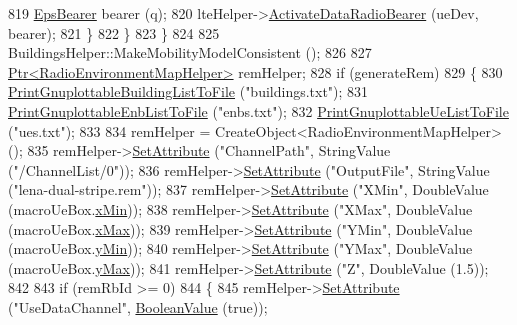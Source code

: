\begin{DoxyCode}
819               \hyperlink{structns3_1_1EpsBearer}{EpsBearer} bearer (q);
820               lteHelper->\hyperlink{classns3_1_1LteHelper_ac896e16cf162e4beeaa292d39ab1b700}{ActivateDataRadioBearer} (ueDev, bearer);
821             \}
822         \}
823     \}
824 
825   BuildingsHelper::MakeMobilityModelConsistent ();
826 
827   \hyperlink{classns3_1_1Ptr}{Ptr<RadioEnvironmentMapHelper>} remHelper;
828   \textcolor{keywordflow}{if} (generateRem)
829     \{
830       \hyperlink{lena-dual-stripe_8cc_aa3ac76c624e240e8ea6e415ff2289b4b}{PrintGnuplottableBuildingListToFile} (\textcolor{stringliteral}{"buildings.txt"});
831       \hyperlink{lena-dual-stripe_8cc_a7e3aa5272ba032faa7717e0f3ba2f73d}{PrintGnuplottableEnbListToFile} (\textcolor{stringliteral}{"enbs.txt"});
832       \hyperlink{lena-dual-stripe_8cc_ad818a3dd4c090b8ecaba926e5272c409}{PrintGnuplottableUeListToFile} (\textcolor{stringliteral}{"ues.txt"});
833 
834       remHelper = CreateObject<RadioEnvironmentMapHelper> ();
835       remHelper->\hyperlink{classns3_1_1ObjectBase_ac60245d3ea4123bbc9b1d391f1f6592f}{SetAttribute} (\textcolor{stringliteral}{"ChannelPath"}, StringValue (\textcolor{stringliteral}{"/ChannelList/0"}));
836       remHelper->\hyperlink{classns3_1_1ObjectBase_ac60245d3ea4123bbc9b1d391f1f6592f}{SetAttribute} (\textcolor{stringliteral}{"OutputFile"}, StringValue (\textcolor{stringliteral}{"lena-dual-stripe.rem"}));
837       remHelper->\hyperlink{classns3_1_1ObjectBase_ac60245d3ea4123bbc9b1d391f1f6592f}{SetAttribute} (\textcolor{stringliteral}{"XMin"}, DoubleValue (macroUeBox.\hyperlink{classns3_1_1Box_a1fd6a43d53258323331d34da600ff1c5}{xMin}));
838       remHelper->\hyperlink{classns3_1_1ObjectBase_ac60245d3ea4123bbc9b1d391f1f6592f}{SetAttribute} (\textcolor{stringliteral}{"XMax"}, DoubleValue (macroUeBox.\hyperlink{classns3_1_1Box_a50021049c756e770329145b25d9533a2}{xMax}));
839       remHelper->\hyperlink{classns3_1_1ObjectBase_ac60245d3ea4123bbc9b1d391f1f6592f}{SetAttribute} (\textcolor{stringliteral}{"YMin"}, DoubleValue (macroUeBox.\hyperlink{classns3_1_1Box_a3865ed092f941186823539c9979002f8}{yMin}));
840       remHelper->\hyperlink{classns3_1_1ObjectBase_ac60245d3ea4123bbc9b1d391f1f6592f}{SetAttribute} (\textcolor{stringliteral}{"YMax"}, DoubleValue (macroUeBox.\hyperlink{classns3_1_1Box_a001fd430a14b19efe925c818a332e392}{yMax}));
841       remHelper->\hyperlink{classns3_1_1ObjectBase_ac60245d3ea4123bbc9b1d391f1f6592f}{SetAttribute} (\textcolor{stringliteral}{"Z"}, DoubleValue (1.5));
842 
843       \textcolor{keywordflow}{if} (remRbId >= 0)
844         \{
845           remHelper->\hyperlink{classns3_1_1ObjectBase_ac60245d3ea4123bbc9b1d391f1f6592f}{SetAttribute} (\textcolor{stringliteral}{"UseDataChannel"}, \hyperlink{classns3_1_1BooleanValue}{BooleanValue} (\textcolor{keyword}{true}));

\end{DoxyCode}
